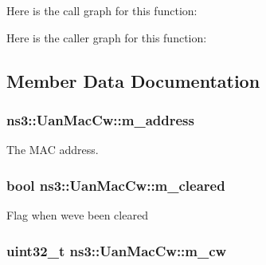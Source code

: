 Here is the call graph for this function\+:




Here is the caller graph for this function\+:




\subsection{Member Data Documentation}
\subsubsection[{\texorpdfstring{m\+\_\+address}{m_address}}]{ ns3\+::\+Uan\+Mac\+Cw\+::m\+\_\+address\hspace{0.3cm}{\ttfamily [private]}}\hypertarget{classns3_1_1UanMacCw_afd22415ba2abfd66f830d9adee47b43e}{}\label{classns3_1_1UanMacCw_afd22415ba2abfd66f830d9adee47b43e}
The M\+AC address. 
\subsubsection[{\texorpdfstring{m\+\_\+cleared}{m_cleared}}]{\setlength{\rightskip}{0pt plus 5cm}bool ns3\+::\+Uan\+Mac\+Cw\+::m\+\_\+cleared\hspace{0.3cm}{\ttfamily [private]}}\hypertarget{classns3_1_1UanMacCw_a28eea3461bb56e7acd79ecb258e8daf8}{}\label{classns3_1_1UanMacCw_a28eea3461bb56e7acd79ecb258e8daf8}
Flag when we\textquotesingle{}ve been cleared 
\subsubsection[{\texorpdfstring{m\+\_\+cw}{m_cw}}]{\setlength{\rightskip}{0pt plus 5cm}uint32\+\_\+t ns3\+::\+Uan\+Mac\+Cw\+::m\+\_\+cw\hspace{0.3cm}{\ttfamily [private]}}\hypertarget{classns3_1_1UanMacCw_adeaa1556fd593b364a2cba5729d48ab9}{}\label{classns3_1_1UanMacCw_adeaa1556fd593b364a2cba5729d48ab9}


